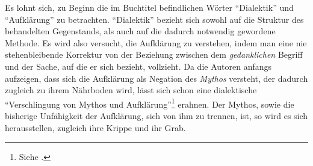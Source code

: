 \documentclass[a4paper, 12pt]{article}
\begin{document}
\begin{onehalfspace}
Es lohnt sich, zu Beginn die im Buchtitel befindlichen Wörter "`Dialektik"' und "`Aufklärung"' zu betrachten. "`Dialektik"' bezieht sich sowohl auf die Struktur des behandelten Gegenstands, als auch auf die dadurch notwendig gewordene Methode. Es wird also versucht, die Aufklärung zu verstehen, indem man eine nie stehenbleibende Korrektur von der Beziehung zwischen dem \emph{gedanklichen} Begriff und der Sache, auf die er sich bezieht, vollzieht.  Da die Autoren anfangs aufzeigen, dass sich die Aufklärung als Negation des \emph{Mythos} versteht, der dadurch zugleich zu ihrem Nährboden wird, lässt sich schon eine dialektische "`Verschlingung von Mythos und Aufklärung"'\footnote{Siehe \Cite{habermas}.} erahnen. Der Mythos, sowie die bisherige Unfähigkeit der Aufklärung, sich von ihm zu trennen, ist, so wird es sich herausstellen, zugleich ihre Krippe und ihr Grab.


\end{onehalfspace}
\end{document}
